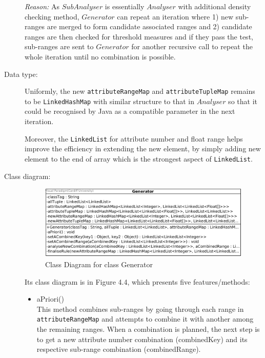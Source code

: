 \begin{description}
\textit{Reason: } As $SubAnalyser$ is essentially $Analyser$ with additional density checking method, $Generator$ can repeat an iteration where 1) new sub-ranges are merged to form candidate associated ranges and 2) candidate ranges are then checked for threshold measures and if they pass the test, sub-ranges are sent to $Generator$ for another recursive call to repeat the whole iteration until no combination is possible.

\item[Data type: ] Uniformly, the new \texttt{attributeRangeMap} and \texttt{attributeTupleMap} remains to be \texttt{LinkedHashMap} with similar structure to that in $Analyser$ so that it could be recognised by Java as a compatible parameter in the next iteration.

Moreover, the \texttt{LinkedList} for attribute number and float range helps improve the efficiency in extending the new element, by simply adding new element to the end of array which is the strongest aspect of \texttt{LinkedList}.

\item[Class diagram: ] 

\begin{figure}[h]
    \centering
    \includegraphics[width=5in]{figures/class_generator}
    \caption[Class Diagram for class Generator]{Class Diagram for class Generator}
    \label{fig:figure4_4}
\end{figure}

Its class diagram is in Figure 4.4, which presents five features/methods:

\begin{itemize}
	\item{aPriori()} \\
	This method combines sub-ranges by going through each range in \texttt{attributeRangeMap} and attempts to combine it with another among the remaining ranges. When a combination is planned, the next step is to get a new attribute number combination (combinedKey) and its respective sub-range combination (combinedRange). 
	

\end{itemize}
\end{description}

